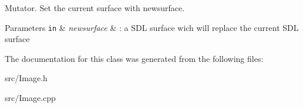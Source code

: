 Mutator. Set the current surface with newsurface. 


\begin{DoxyParams}[1]{Parameters}
\mbox{\tt in}  & {\em newsurface} & \+: a S\+DL surface wich will replace the current S\+DL surface \\
\hline
\end{DoxyParams}


The documentation for this class was generated from the following files\+:\begin{DoxyCompactItemize}
\item 
src/Image.\+h\item 
src/Image.\+cpp\end{DoxyCompactItemize}
